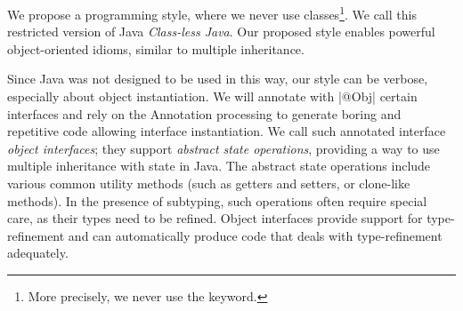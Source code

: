 

We propose a programming style, where we never use classes\footnote{More precisely, we never use the \Q@class@ keyword.}.
We call this restricted version of Java \emph{Class-less Java}.
Our proposed style enables powerful object-oriented idioms, similar to 
multiple inheritance.

Since Java was not designed to be used in this way, our style can be verbose, especially about
object instantiation.
We will annotate with \Q|@Obj| certain interfaces and rely on
the Annotation processing to generate boring and repetitive code
allowing interface instantiation.
We call such annotated interface \emph{object interfaces};
they support \emph{abstract state operations}, providing a way
to use multiple inheritance with state in Java. The abstract state
operations include various common utility methods (such as getters and
setters, or clone-like methods). In the presence of subtyping, such
operations often require special care, as their types need to be
refined. Object interfaces provide support for type-refinement and can
automatically produce code that deals with type-refinement
adequately. %


%

